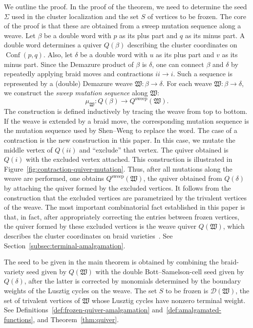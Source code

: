 \documentclass[10pt,a4paper]{article}
\theoremstyle{definition}
\theoremstyle{remark}
\newcommand{\Conf}{\operatorname{Conf}}
\newcommand{\Dcal}{\mathcal D}
\newcommand{\fW}{\mathfrak W}
\begin{document}
We outline the proof.  In the proof of the theorem, we need to determine the
seed \(\Sigma\) used in the cluster localization and the set \(S\) of vertices
to be frozen.  The core of the proof is that these are obtained from a sweep
mutation sequence along a weave.  Let \(\beta\) be a double word with \(p\) as
its plus part and \(q\) as its minus part.  A double word determines a quiver 
\(Q(\beta)\) describing the cluster coordinates on
\(\Conf(p,q)\).  Also, let \(\delta\) be a double word with \(u\) as its plus
part and \(v\) as its minus part.  Since the Demazure product of \(\beta\) is
\(\delta\), one can connect \(\beta\) and \(\delta\) by repeatedly applying
braid moves and contractions \(ii\to i\).  Such a sequence is represented by a
(double) Demazure weave \(\fW:\beta\to\delta\).  For each weave
\(\fW:\beta\to\delta\), we construct the \emph{sweep mutation sequence} along \(\fW\):
\[
  \mu_\fW:
  Q(\beta)
  \longrightarrow Q^{\mathrm{sweep}}(\fW).
\]
The construction is defined inductively by tracing the weave from top to
bottom.  If the weave is extended by a braid move, the corresponding mutation
sequence is the mutation sequence used by Shen--Weng to replace the word.  The
case of a contraction is the new construction in this paper.  In this case, we
mutate the middle vertex of \(Q(ii)\) and ``exclude'' that vertex.  The quiver
obtained is \(Q(i)\) with the excluded vertex attached.  This construction is
illustrated in Figure~\ref{fig:contraction-quiver-mutation}.  Thus, after all
mutations along the weave are performed, one obtains
\(Q^{\mathrm{sweep}}(\fW)\), the quiver obtained from \(Q(\delta)\) by
attaching the quiver formed by the excluded vertices.  It follows from the
construction that the excluded vertices are parametrized by the trivalent
vertices of the weave.  The most important combinatorial fact established in
this paper is that, in fact, after appropriately correcting the entries
between frozen vertices, the quiver formed by these excluded vertices is the
weave quiver \(Q(\fW)\), which describes the cluster coordinates on braid
varieties~\cite{CasalsEtAlBraidVarieties}. See Section~\ref{subsec:terminal-amalgamation}.

The seed to be given in the main theorem is obtained by combining the
braid-variety seed given by \(Q(\fW)\) with the double Bott--Samelson-cell seed
given by \(Q(\delta)\), after the latter is corrected by monomials determined by
the boundary weights of the Lusztig cycles on the weave.  The set \(S\) to be
frozen is \(\Dcal(\fW)\), the set of trivalent vertices of \(\fW\) whose
Lusztig cycles have nonzero terminal weight.  See
Definitions~\ref{def:frozen-quiver-amalgamation}
and~\ref{def:amalgamated-functions}, and Theorem~\ref{thm:quiver}.
\end{document}
